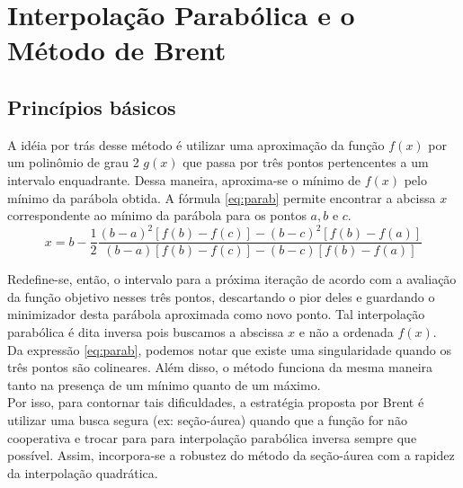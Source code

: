 \section{Interpolação Parabólica e o Método de Brent}

\vspace{0.5cm}

\subsection{Princípios básicos}

\vspace{0.5cm}

A idéia por trás desse método é utilizar uma aproximação da função $f(x)$ por um polinômio de grau 2 $g(x)$ que passa por três pontos pertencentes a um intervalo enquadrante. Dessa maneira, aproxima-se o mínimo de $f(x)$ pelo mínimo da parábola obtida. A fórmula \ref{eq:parab} permite encontrar a abcissa $x$ correspondente ao mínimo da parábola para os pontos $a,b$ e $c$.\\

\begin{equation}
  x = b - \frac{1}{2}\frac{(b-a)^2[f(b)-f(c)] - (b-c)^2[f(b)-f(a)]}{(b-a)[f(b)-f(c)] - (b-c)[f(b)-f(a)]} 
  \label{eq:parab}
\end{equation}

\vspace{0.5cm}

Redefine-se, então, o intervalo para a próxima iteração de acordo com a avaliação da função objetivo nesses três pontos, descartando o pior deles e guardando o minimizador desta parábola aproximada como novo ponto. Tal interpolação parabólica é dita inversa pois buscamos a abscissa $x$ e não a ordenada $f(x)$. \\

Da expressão \ref{eq:parab}, podemos notar que existe uma singularidade quando os três pontos são colineares. Além disso, o método funciona da mesma maneira tanto na presença de um mínimo quanto de um máximo. \\

Por isso, para contornar tais dificuldades, a estratégia proposta por Brent é utilizar uma busca segura (ex: seção-áurea) quando que a função for não cooperativa e trocar para para interpolação parabólica inversa sempre que possível. Assim, incorpora-se a robustez do método da seção-áurea com a rapidez da interpolação quadrática.\\

